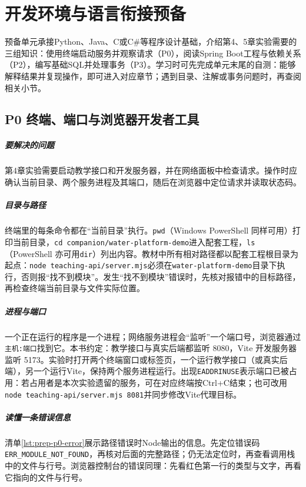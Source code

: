 \chapter{开发环境与语言衔接预备}
\label{app:prep}

预备单元承接Python、Java、C或C\#等程序设计基础，介绍第4、5章实验需要的三组知识：使用终端启动服务并观察请求（P0），阅读Spring Boot工程与依赖关系（P2），编写基础SQL并处理事务（P3）。学习时可先完成单元末尾的自测：能够解释结果并复现操作，即可进入对应章节；遇到目录、注解或事务问题时，再查阅相关小节。

\section{P0 终端、端口与浏览器开发者工具}
\label{app:prep-p0}

\paragraph{要解决的问题}第4章实验需要启动教学接口和开发服务器，并在网络面板中检查请求。操作时应确认当前目录、两个服务进程及其端口，随后在浏览器中定位请求并读取状态码。

\paragraph{目录与路径}终端里的每条命令都在“当前目录”执行。\texttt{pwd}（Windows PowerShell 同样可用）打印当前目录，\texttt{cd companion/water-platform-demo}进入配套工程，\texttt{ls}（PowerShell 亦可用\texttt{dir}）列出内容。教材中所有相对路径都以配套工程根目录为起点：\texttt{node teaching-api/server.mjs}必须在\texttt{water-platform-demo}目录下执行，否则报“找不到模块”。发生“找不到模块”错误时，先核对报错中的目标路径，再检查终端当前目录与文件实际位置。

\paragraph{进程与端口}一个正在运行的程序是一个进程；网络服务进程会“监听”一个端口号，浏览器通过\texttt{主机:端口}找到它。本书约定：教学接口与真实后端都监听 8080，Vite 开发服务器监听 5173。实验时打开两个终端窗口或标签页，一个运行教学接口（或真实后端），另一个运行Vite，保持两个服务进程运行。出现\texttt{EADDRINUSE}表示端口已被占用：若占用者是本次实验遗留的服务，可在对应终端按Ctrl+C结束；也可改用\texttt{node teaching-api/server.mjs 8081}并同步修改Vite代理目标。

\paragraph{读懂一条错误信息}清单\ref{lst:prep-p0-error}展示路径错误时Node输出的信息。先定位错误码\texttt{ERR\_MODULE\_NOT\_FOUND}，再核对后面的完整路径；仍无法定位时，再查看调用栈中的文件与行号。浏览器控制台的错误同理：先看红色第一行的类型与文字，再看它指向的文件与行号。

